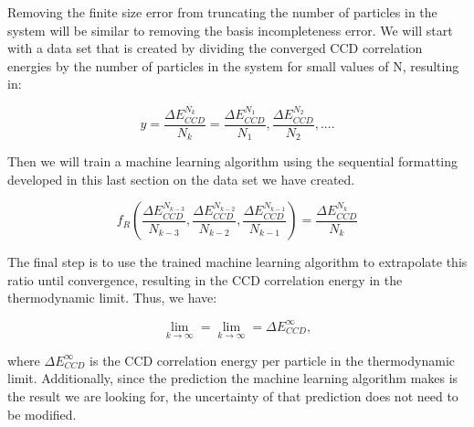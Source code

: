 Removing the finite size error from truncating the number of particles in the system will be similar to removing the basis incompleteness error.  We will start with a data set that is created by dividing the converged CCD correlation energies by the number of particles in the system for small values of N, resulting in:

\begin{equation}
    y = \frac{\Delta E_{CCD}^{N_k}}{N_k} = \frac{\Delta E_{CCD}^{N_1}}{N_1}, \frac{\Delta E_{CCD}^{N_2}}{N_2}, ... .
\end{equation}

Then we will train a machine learning algorithm using the sequential formatting developed in this last section on the data set we have created.

\begin{equation}
    f_R(\frac{\Delta E_{CCD}^{N_{k-3}}}{N_{k-3}}, \frac{\Delta E_{CCD}^{N_{k-2}}}{N_{k-2}}, \frac{\Delta E_{CCD}^{N_{k-1}}}{N_{k-1}}) = \frac{\Delta E_{CCD}^{N_{k}}}{N_{k}}
\end{equation}

The final step is to use the trained machine learning algorithm to extrapolate this ratio until convergence, resulting in the CCD correlation energy in the thermodynamic limit.  Thus, we have:

\begin{equation}
    \lim_{k\to\infty} = \lim_{k\to\infty} = \Delta E_{CCD}^\infty,
\end{equation}

where $\Delta E_{CCD}^\infty$ is the CCD correlation energy per particle in the thermodynamic limit.  Additionally, since the prediction the machine learning algorithm makes is the result we are looking for, the uncertainty of that prediction does not need to be modified.